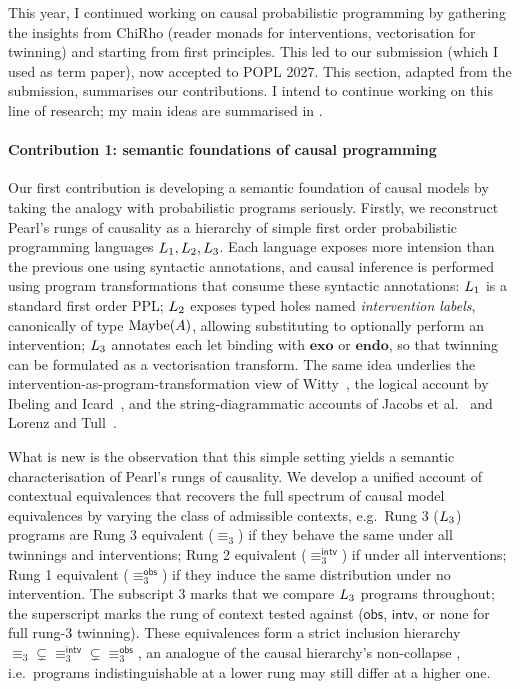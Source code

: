 \documentclass[11pt,a4paper]{article}
\begin{document}
This year, I continued working on causal probabilistic programming by gathering the insights from ChiRho (reader monads for interventions, vectorisation for twinning) and starting from first principles. This led to our submission (which I used as term paper), now accepted to POPL 2027. This section, adapted from the submission, summarises our contributions. I intend to continue working on this line of research; my main ideas are summarised in . 

\paragraph{Contribution 1: semantic foundations of causal programming}\label{par:contrib1}
Our first contribution is developing a semantic foundation of causal models by taking the analogy with probabilistic programs seriously. Firstly, we reconstruct Pearl's rungs of causality as a hierarchy of simple first order probabilistic programming languages $L_1, L_2, L_3$.  Each language exposes more intension than the previous one using syntactic annotations, and causal inference is performed using program transformations that consume these syntactic annotations: $L_1$ is a standard first order PPL; $L_2$ exposes typed holes named \emph{intervention labels}, canonically of type $\mathrm{Maybe}({A})$, allowing substituting to optionally perform an intervention; $L_3$ annotates each let binding with $\mathbf{exo}$ or $\mathbf{endo}$, so that twinning can be formulated as a vectorisation transform. The same idea underlies the intervention-as-program-transformation view of Witty~\cite{witty2021sbi,witty2023bayesian}, the logical account by Ibeling and Icard~\cite{ibeling2020hierarchy}, and the string-diagrammatic accounts of Jacobs et al.~\cite{jacobs2019causal} and Lorenz and Tull~\cite{lorenz2023causalmodelsstringdiagrams}. 

What is new is the observation that this simple setting yields a semantic characterisation of Pearl's rungs of causality. We develop a unified account of contextual equivalences that recovers the full spectrum of causal model equivalences by varying the class of admissible contexts, e.g.~Rung 3 ($L_3$) programs are Rung 3 equivalent ($\equiv_3$) if they behave the same under all twinnings and interventions; Rung 2 equivalent ($\equiv_3^{\mathsf{intv}}$) if under all interventions; Rung 1 equivalent ($\equiv_3^{\mathsf{obs}}$) if they induce the same distribution under no intervention. The subscript $3$ marks that we compare $L_3$ programs throughout; the superscript marks the rung of context tested against ($\mathsf{obs}$, $\mathsf{intv}$, or none for full rung-3 twinning). These equivalences form a strict inclusion hierarchy $\equiv_3 \subsetneq \equiv_3^{\mathsf{intv}} \subsetneq \equiv_3^{\mathsf{obs}}$, an analogue of the causal hierarchy's non-collapse \cite{bareinboim:etal20}, i.e.~programs indistinguishable at a lower rung may still differ at a higher one.
\end{document}
